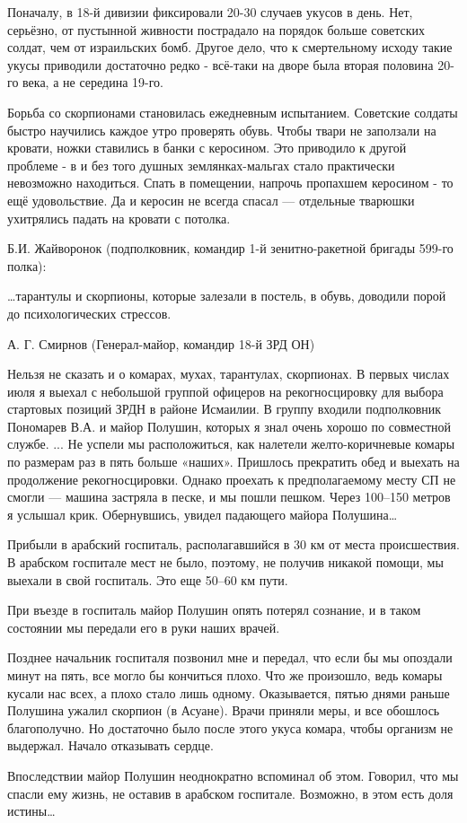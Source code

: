 Поначалу, в 18-й дивизии фиксировали 20-30 случаев укусов в день. Нет, серьёзно, от пустынной живности пострадало на порядок больше советских солдат, чем от израильских бомб. Другое дело, что к смертельному исходу такие укусы приводили достаточно редко - всё-таки на дворе была вторая половина 20-го века, а не середина 19-го.

Борьба со скорпионами становилась ежедневным испытанием. Советские солдаты быстро научились каждое утро проверять обувь. Чтобы твари не заползали на кровати, ножки ставились в банки с керосином. Это приводило к другой проблеме - в и без того душных землянках-мальгах стало практически невозможно находиться. Спать в помещении, напрочь пропахшем керосином - то ещё удовольствие. Да и керосин не всегда спасал — отдельные тварюшки ухитрялись падать на кровати с потолка. 

Б.И. Жайворонок (подполковник, командир 1-й зенитно-ракетной бригады 599-го полка):
\begin{textcitation}
	…тарантулы и скорпионы, которые залезали в постель, в обувь, доводили порой до психологических стрессов.
\end{textcitation}

А. Г. Смирнов (Генерал-майор, командир 18-й ЗРД ОН)

\begin{textcitation}
	Нельзя не сказать и о комарах, мухах, тарантулах, скорпионах. В первых числах июля я выехал с небольшой группой офицеров на рекогносцировку для выбора стартовых позиций ЗРДН в районе Исмаилии. В группу входили подполковник Пономарев В.А. и майор Полушин, которых я знал очень хорошо по совместной службе. ... Не успели мы расположиться, как налетели желто-коричневые комары по размерам раз в пять больше «наших». Пришлось прекратить обед и выехать на продолжение рекогносцировки. Однако проехать к предполагаемому месту СП не смогли — машина застряла в песке, и мы пошли пешком. Через 100–150 метров я услышал крик. Обернувшись, увидел падающего майора Полушина… 
	
	Прибыли в арабский госпиталь, располагавшийся в 30 км от места происшествия. В арабском госпитале мест не было, поэтому, не получив никакой помощи, мы выехали в свой госпиталь. Это еще 50–60 км пути.
	
	При въезде в госпиталь майор Полушин опять потерял сознание, и в таком состоянии мы передали его в руки наших врачей.
	
	Позднее начальник госпиталя позвонил мне и передал, что если бы мы опоздали минут на пять, все могло бы кончиться плохо. Что же произошло, ведь комары кусали нас всех, а плохо стало лишь одному. Оказывается, пятью днями раньше Полушина ужалил скорпион (в Асуане). Врачи приняли меры, и все обошлось благополучно. Но достаточно было после этого укуса комара, чтобы организм не выдержал. Начало отказывать сердце.
	
	Впоследствии майор Полушин неоднократно вспоминал об этом. Говорил, что мы спасли ему жизнь, не оставив в арабском госпитале. Возможно, в этом есть доля истины…
\end{textcitation}

